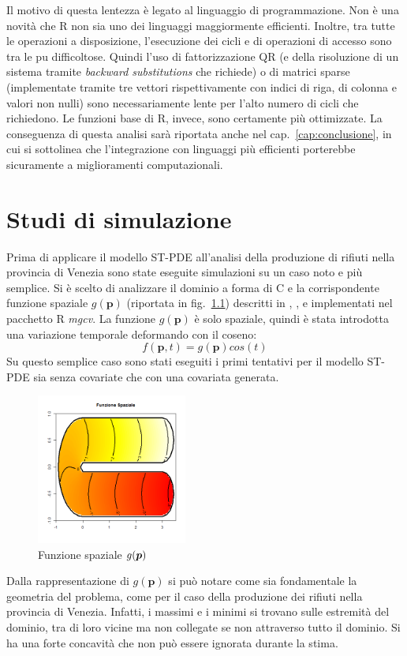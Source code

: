 \documentclass[a4paper,11pt,twoside,openright]{book}							%
\begin{document}
Il motivo di questa lentezza è legato al linguaggio di programmazione. Non è una novità che R non sia uno dei linguaggi maggiormente efficienti. Inoltre, tra tutte le operazioni a disposizione, l'esecuzione dei cicli e di operazioni di accesso sono tra le pu difficoltose. Quindi l'uso di fattorizzazione QR (e della risoluzione di un sistema tramite \textit{backward substitutions} che richiede) o di matrici sparse (implementate tramite tre vettori rispettivamente con indici di riga, di colonna e valori non nulli) sono necessariamente lente per l'alto numero di cicli che richiedono. Le funzioni base di R, invece, sono certamente più ottimizzate. La conseguenza di questa analisi sarà riportata anche nel cap.~\ref{cap:conclusione}, in cui si sottolinea che l'integrazione con linguaggi più efficienti porterebbe sicuramente a miglioramenti computazionali.

\chapter{Studi di simulazione}
\label{cap:domC}
Prima di applicare il modello ST-PDE all'analisi della produzione di rifiuti nella provincia di Venezia sono state eseguite simulazioni su un caso noto e più semplice. Si è scelto di analizzare il dominio a forma di C e la corrispondente funzione spaziale $g(\bm p)$ (riportata in fig.~\ref{fig:domC_fstest}) descritti in \cite{art:ramsay}, \cite{art:sangalli}, \cite{art:wood} e implementati nel pacchetto R \textit{mgcv}. La funzione $g(\bm p)$ è solo spaziale, quindi è stata introdotta una variazione temporale deformando con il coseno:
$$
f(\bm p, t)=g(\bm p)cos(t)
$$
Su questo semplice caso sono stati eseguiti i primi tentativi per il modello ST-PDE sia senza covariate che con una covariata generata.
\begin{figure}[h]
	\centering
	\includegraphics[width=0.44\textwidth]{Immagini/DomCinizio/DomC_fstest.png}   
	\caption{Funzione spaziale $g(\protect\bm{p})$}
	\label{fig:domC_fstest}
\end{figure}
\newpage
Dalla rappresentazione di $g(\bm p)$ si può notare come sia fondamentale la geometria del problema, come per il caso della produzione dei rifiuti nella provincia di Venezia. Infatti, i massimi e i minimi si trovano sulle estremità del dominio, tra di loro vicine ma non collegate se non attraverso tutto il dominio. Si ha una forte concavità che non può essere ignorata durante la stima.
\end{document}
